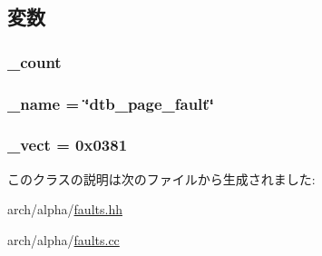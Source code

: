 \subsection{変数}
\hypertarget{classAlphaISA_1_1DtbPageFault_a4bff925c412f331c5aaf6a39b79619ff}{
\subsubsection[{\_\-count}]{ {\bf \_\-count}}}
\label{classAlphaISA_1_1DtbPageFault_a4bff925c412f331c5aaf6a39b79619ff}
\hypertarget{classAlphaISA_1_1DtbPageFault_ac79073ffcd2c66a09bcd3bd3ad206019}{
\subsubsection[{\_\-name}]{ {\bf \_\-name} = \char`\"{}dtb\_\-page\_\-fault\char`\"{}}}
\label{classAlphaISA_1_1DtbPageFault_ac79073ffcd2c66a09bcd3bd3ad206019}
\hypertarget{classAlphaISA_1_1DtbPageFault_ad9e5855b9db0b2824cf6c507be4a872e}{
\subsubsection[{\_\-vect}]{ {\bf \_\-vect} = 0x0381}}
\label{classAlphaISA_1_1DtbPageFault_ad9e5855b9db0b2824cf6c507be4a872e}


このクラスの説明は次のファイルから生成されました:\begin{DoxyCompactItemize}
\item 
arch/alpha/\hyperlink{arch_2alpha_2faults_8hh}{faults.hh}\item 
arch/alpha/\hyperlink{arch_2alpha_2faults_8cc}{faults.cc}\end{DoxyCompactItemize}

